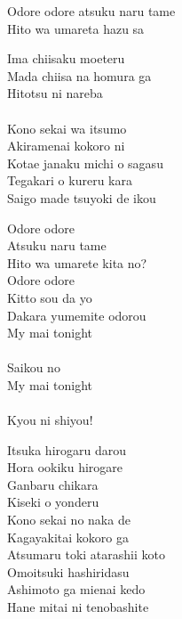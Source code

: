 \def\songtitle{MY Mai☆TONIGHT}
\def\songcomment{Season 2 Insert Song}
\def\songlyrics{Aki Hata}
\def\songwriter{EFFY}
\def\songarrange{EFFY}
   
\ifdefined\COMPLETE
\else
	
	
\fi
\thispagestyle{song}

\begin{multicols}{2}
Odore odore atsuku naru tame\\
Hito wa umareta hazu sa\\


Ima chiisaku moeteru\\
Mada chiisa na homura ga\\
Hitotsu ni nareba\\
\\
Kono sekai wa itsumo\\
Akiramenai kokoro ni\\
Kotae janaku michi o sagasu\\
Tegakari o kureru kara\\
Saigo made tsuyoki de ikou\\


Odore odore\\
Atsuku naru tame\\
Hito wa umarete kita no?\\
Odore odore\\
Kitto sou da yo\\
Dakara yumemite odorou\\

My mai tonight\\
\\
Saikou no\\
My mai tonight\\
\\
Kyou ni shiyou!\\


Itsuka hirogaru darou\\
Hora ookiku hirogare\\
Ganbaru chikara\\
Kiseki o yonderu\\
Kono sekai no naka de\\
Kagayakitai kokoro ga\\
Atsumaru toki atarashii koto\\
Omoitsuki hashiridasu\\
Ashimoto ga mienai kedo\\
Hane mitai ni tenobashite\columnbreak


\end{multicols}
